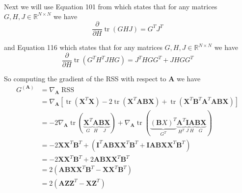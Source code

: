 \documentclass{article}
\begin{document}
Next we will use Equation 101 from \textcite{petersenMatrixCookbook2012} which states that for any matrices $G, H, J \in \mathbb{R}^{N \times N}$ we have\begin{equation}
    \label{eq:cookbook_101}
    \frac{\partial}{\partial H}\operatorname{tr}(GHJ) = G^T J^T
\end{equation}

and Equation 116 which states that for any matrices $G, H, J \in \mathbb{R}^{N \times N}$ we have
\begin{equation}
    \label{eq:cookbook_116}
    \frac{\partial}{\partial H}\operatorname{tr}(G^T H^T J H G) = J^T H G G^T + J H G G^T
\end{equation}

So computing the gradient of the RSS with respect to $\mathbf{A}$ we have
\begin{equation}
    \label{eq:gradA}
    \begin{aligned}
        G^{(\mathbf{A})} &= \nabla_\mathbf{A} \operatorname{RSS} \\
        &=\nabla_\mathbf{A} \left[ \operatorname{tr}(\mathbf{X}^T \mathbf{X}) - 2 \operatorname{tr}(\mathbf{X}^T \mathbf{A} \mathbf{B} \mathbf{X}) + \operatorname{tr}(\mathbf{X}^T \mathbf{B}^T \mathbf{A}^T \mathbf{A} \mathbf{B} \mathbf{X}) \right] \\
        &= - 2 \nabla_\mathbf{A} \operatorname{tr}(\underbrace{\mathbf{X}^T}_{G} \underbrace{\mathbf{A}}_{H} \underbrace{\mathbf{B} \mathbf{X}}_{J}) + \nabla_\mathbf{A} \operatorname{tr}(\underbrace{(\mathbf{B} X)^T}_{G^T} \underbrace{\mathbf{A}^T}_{H^T} \underbrace{\mathbf{I}}_{J} \underbrace{\mathbf{A}}_{H} \underbrace{\mathbf{B} \mathbf{X}}_{G}) \\
        &= - 2 \mathbf{X} \mathbf{X}^T \mathbf{B}^T + \left( \mathbf{I}^T \mathbf{A} \mathbf{B} \mathbf{X} \mathbf{X}^T \mathbf{B}^T + \mathbf{I} \mathbf{A} \mathbf{B} \mathbf{X} \mathbf{X}^T \mathbf{B}^T \right) \\
        &= - 2 \mathbf{X} \mathbf{X}^T \mathbf{B}^T + 2 \mathbf{A} \mathbf{B} \mathbf{X} \mathbf{X}^T \mathbf{B}^T \\
        &= 2 \left( \mathbf{A} \mathbf{B} \mathbf{X} \mathbf{X}^T \mathbf{B}^T - \mathbf{X} \mathbf{X}^T \mathbf{B}^T \right) \\
        &= 2 \left( \mathbf{A} \mathbf{Z} \mathbf{Z}^T - \mathbf{X} \mathbf{Z}^T \right)
    \end{aligned}
\end{equation}
\end{document}
